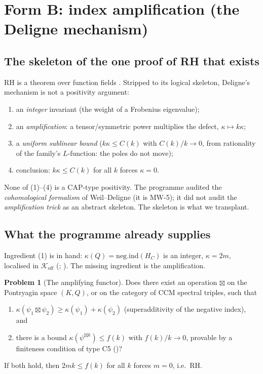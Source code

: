 \documentclass[11pt]{amsart}
\theoremstyle{definition}
\newtheorem{problem}[theorem]{Problem}
\theoremstyle{remark}
\newcommand{\negind}{\mathrm{neg.ind}}
\begin{document}
\section{Form B: index amplification (the Deligne mechanism)}\label{sec:formB}

\subsection{The skeleton of the one proof of RH that exists}
RH is a theorem over function fields \cite{Del74}. Stripped to its logical
skeleton, Deligne's mechanism is not a positivity argument:
\begin{enumerate}[\rm(1)]
\item an \emph{integer} invariant (the weight of a Frobenius eigenvalue);
\item an \emph{amplification}: a tensor/symmetric power multiplies the
defect, $\kappa\mapsto k\kappa$;
\item a \emph{uniform sublinear bound} ($k\kappa\leq C(k)$ with $C(k)/k\to0$,
from rationality of the family's $L$-function: the poles do not move);
\item conclusion: $k\kappa\leq C(k)$ for all $k$ forces $\kappa=0$.
\end{enumerate}
None of (1)--(4) is a CAP-type positivity. The programme audited the
\emph{cohomological formalism} of Weil--Deligne (it is MW-5); it did not
audit the \emph{amplification trick} as an abstract skeleton. The skeleton
is what we transplant.

\subsection{What the programme already supplies}
Ingredient (1) is in hand: $\kappa(Q)=\negind(H_C)$ is an integer,
$\kappa=2m$, localised in $\mathcal{K}_{\mathrm{off}}$
(\cite{P35}; \cite[]{P40}). The missing ingredient is the
amplification.

\begin{problem}[The amplifying functor]\label{prob:amplify}
Does there exist an operation $\boxtimes$ on the Pontryagin space $(K,Q)$,
or on the category of CCM spectral triples, such that
\begin{enumerate}[\rm(a)]
\item $\kappa(\psi_1\boxtimes\psi_2)\geq\kappa(\psi_1)+\kappa(\psi_2)$
(superadditivity of the negative index), and
\item there is a bound $\kappa(\psi^{\boxtimes k})\leq f(k)$ with
$f(k)/k\to0$, provable by a finiteness condition of type C5
(\cite[]{P40})?
\end{enumerate}
If both hold, then $2mk\leq f(k)$ for all $k$ forces $m=0$, i.e.\ RH.
\end{problem}
\end{document}
